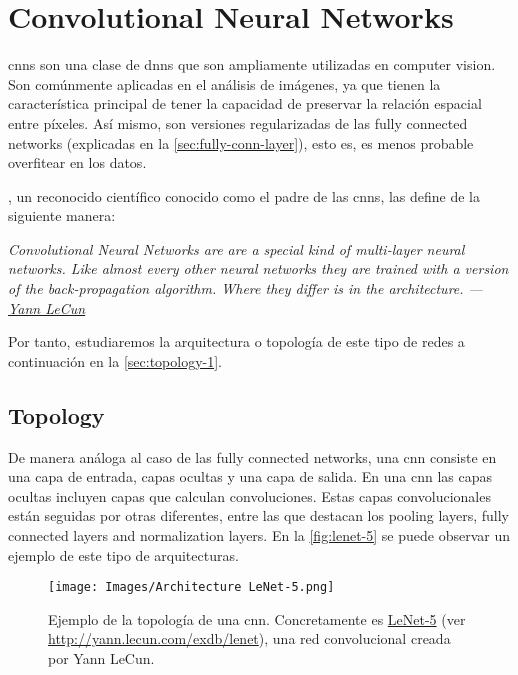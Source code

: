 \section{Convolutional Neural Networks}
\label{sec:conv-neur-netw}

\glspl{cnn} son una clase de \glspl{dnn} que son ampliamente utilizadas en
computer vision. Son comúnmente aplicadas en el análisis de imágenes, ya que
tienen la característica principal de tener la capacidad de preservar la
relación espacial entre píxeles. Así mismo, son versiones regularizadas de las
fully connected networks (explicadas en la \vref{sec:fully-conn-layer}), esto
es, es menos probable overfitear en los datos.

, un reconocido científico
conocido como el padre de las \glspl{cnn}, las define de la siguiente manera:
\begin{quoteBox}
  \itshape
  Convolutional Neural Networks are are a special kind of multi-layer neural
  networks. Like almost every other neural networks they are trained with a
  version of the back-propagation algorithm. Where they differ is in the
  architecture.
  \tcblower
  \hfill \upshape
  ---\href{http://yann.lecun.com/index.html}{Yann LeCun}
\end{quoteBox}

Por tanto, estudiaremos la arquitectura o topología de este tipo de redes a
continuación en la \vref{sec:topology-1}.

\subsection{Topology} \label{sec:topology-1}

De manera análoga al caso de las fully connected networks, una \gls{cnn}
consiste en una capa de entrada, capas ocultas y una capa de salida. En una
\gls{cnn} las capas ocultas incluyen capas que calculan convoluciones. Estas
capas convolucionales están seguidas por otras diferentes, entre las que
destacan los pooling layers, fully connected layers and normalization
layers. En la \vref{fig:lenet-5} se puede observar un ejemplo de este
tipo de arquitecturas.

\begin{figure}[ht]
  \centering
  \texttt{[image: Images/Architecture LeNet-5.png]}
  \caption[Ejemplo de topología de una \acrshort{cnn} (LeNet-5)]{Ejemplo de la
    topología de una \gls{cnn}. Concretamente es
    \href{http://yann.lecun.com/exdb/lenet}{LeNet-5} (ver
    \url{http://yann.lecun.com/exdb/lenet}), una red convolucional creada por
    Yann LeCun.}
  \label{fig:lenet-5}
\end{figure}

